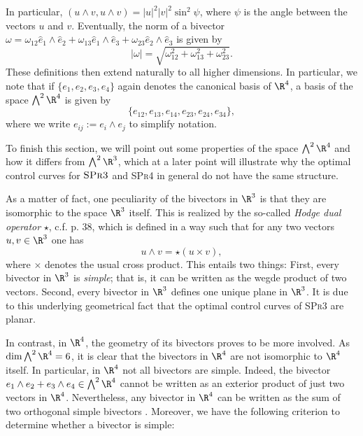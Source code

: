 In particular, $( u \wedge v, u \wedge v ) = |u|^2 |v|^2 \sin^2\psi$, where $\psi$ is the angle between the vectors $u$ and $v$. Eventually, the norm of a bivector $\omega = \omega_{12} \hat{e}_1 \wedge \hat{e}_2 + \omega_{13} \hat{e}_1 \wedge \hat{e}_3 + \omega_{23} \hat{e}_2 \wedge \hat{e}_3$ is given by
\begin{equation}
|\omega| = \sqrt{\omega_{12}^2 + \omega_{13}^2 + \omega_{23}^2}.
\end{equation}
These definitions then extend naturally to all higher dimensions. In particular, we note that if $\{e_1, e_2, e_3, e_4\}$ again denotes the canonical basis of $\R^4$, a basis of the space $\bigwedge^2 \R^4$ is given by
\begin{equation}
\{e_{12}, e_{13}, e_{14}, e_{23}, e_{24}, e_{34}\},
\end{equation}
where we write $e_{ij} := e_i \wedge e_j$ to simplify notation.

To finish this section, we will point out some properties of the space $\bigwedge^2 \R^4$ and how it differs from $\bigwedge^2 \R^3$, which at a later point will illustrate why the optimal control curves for $\textsc{SPr3}$ and \textsc{SPr4} in general do not have the same structure.

As a matter of fact, one peculiarity of the bivectors in $\R^3$ is that they are isomorphic to the space $\R^3$ itself. This is realized by the so-called \emph{Hodge dual operator} $\star$, c.f. \cite{Lounesto2006} p. 38, which is defined in a way such that for any two vectors $u,v \in \R^3$ one has
\begin{equation}
\label{eq: hodge star}
u \wedge v = \star(u \times v),
\end{equation}
where $\times$ denotes the usual cross product. This entails two things: First, every bivector in $\R^3$ is \emph{simple}; that is, it can be written as the wegde product of two vectors. Second, every bivector in $\R^3$ defines one unique plane in $\R^3$. It is due to this underlying geometrical fact that the optimal control curves of \textsc{SPr3} are planar.

In contrast, in $\R^4$, the geometry of its bivectors proves to be more involved. As $\dim \bigwedge^2 \R^4 = 6$, it is clear that the bivectors in $\R^4$ are not isomorphic to $\R^4$ itself. In particular, in $\R^4$ not all bivectors are simple. Indeed, the bivector $e_1 \wedge e_2 + e_3 \wedge e_4 \in \bigwedge^2 \R^4$ cannot be written as an exterior product of just two vectors in $\R^4$. Nevertheless, any bivector in $\R^4$ can be written as the sum of two orthogonal simple bivectors \cite{Lounesto2006}. Moreover, we have the following criterion to determine whether a bivector is simple:


